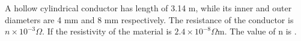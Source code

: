 \item A hollow cylindrical conductor has length of 3.14 m, while its inner and outer diameters are 4 mm and 8 mm respectively. The resistance of the conductor is \( n \times 10^{-3} \Omega \). If the resistivity of the material is \( 2.4 \times 10^{-8} \Omega \text{m} \). The value of n is \underline{\hspace{2.5cm}}.
